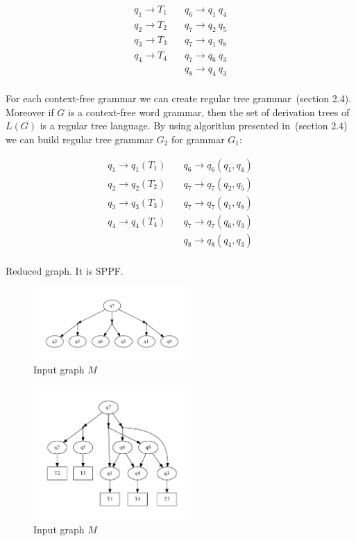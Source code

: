 \documentclass{sig-alternate}
\begin{document}
\begin{align*}
q_1 \rightarrow T_1 \quad & q_6 \rightarrow q_1 \ q_4  \\
q_2 \rightarrow T_2 \quad & q_7 \rightarrow q_2 \ q_5  \\
q_3 \rightarrow T_3 \quad & q_7 \rightarrow q_1 \ q_8  \\
q_4 \rightarrow T_4 \quad & q_7 \rightarrow q_6 \ q_3  \\
                    \quad & q_8 \rightarrow q_4 \ q_3  \\
\end{align*}


For each context-free grammar we can create regular tree grammar~\cite{tata}(section 2.4). Moreover if $G$ is a context-free word grammar, then the set of derivation trees of
$L(G)$ is a regular tree language. By using algorithm presented in~\cite{tata}(section 2.4) we can build regular tree grammar $G_2$ for grammar $G_1$:

\begin{align*}
q_1 \rightarrow q_1(T_1) \quad & q_6 \rightarrow q_6(q_1, q_4)  \\
q_2 \rightarrow q_2(T_2) \quad & q_7 \rightarrow q_7(q_2, q_5)  \\
q_3 \rightarrow q_3(T_3) \quad & q_7 \rightarrow q_7(q_1, q_8)  \\
q_4 \rightarrow q_4(T_4) \quad & q_7 \rightarrow q_7(q_6, q_3)  \\
                         \quad & q_8 \rightarrow q_8(q_4, q_3)  \\
\end{align*}


Reduced graph. It is SPPF.

\begin{figure}[h]
    \begin{center}
        \includegraphics[width=6cm]{altsInSPPF.pdf}
        \caption{Input graph $M$}
        \label{input}        
    \end{center}
\end{figure}


\begin{figure}[h]
    \begin{center}
        \includegraphics[width=6cm]{cleanSPPF.pdf}
        \caption{Input graph $M$}
        \label{input}        
    \end{center}
\end{figure}
\end{document}
